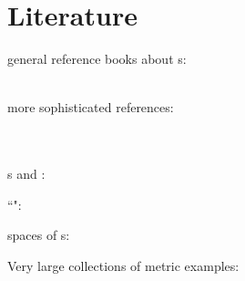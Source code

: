 \section{Literature}
\begin{survey}
\begin{liste}
  \item general reference books about s:
    \\ 
    \\ 

  \item more sophisticated references:
    \\
    \\
    \\\indentdr{}

  \item {}s and :\\

  \item ``":\\

  \item spaces of s:\\

  \item Very large collections of metric examples:\\
    \\

\end{liste}
\end{survey}

